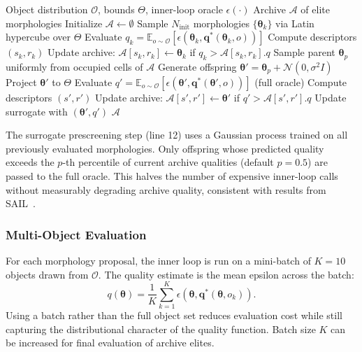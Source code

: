 \documentclass[journal]{IEEEtran}
\newcommand{\btheta}{\boldsymbol{\theta}}
\newcommand{\bq}{\mathbf{q}}
\newcommand{\cO}{\mathcal{O}}
\newcommand{\cA}{\mathcal{A}}
\newcommand{\eps}{\epsilon}
\begin{document}
\begin{algorithm}
\caption{MAP-Elites for Morphology Optimization}
\label{alg:mapelites}
\begin{algorithmic}[1]
\REQUIRE Object distribution $\cO$, bounds $\Theta$, inner-loop oracle $\eps(\cdot)$
\ENSURE Archive $\cA$ of elite morphologies
\STATE Initialize $\cA \leftarrow \emptyset$
\STATE Sample $N_{\text{init}}$ morphologies $\{\btheta_k\}$ via Latin hypercube over $\Theta$
\FOR{each $\btheta_k$}
  \STATE Evaluate $q_k = \mathbb{E}_{o \sim \cO}[\eps(\btheta_k, \bq^*(\btheta_k, o))]$
  \STATE Compute descriptors $(s_k, r_k)$
  \STATE Update archive: $\cA[s_k, r_k] \leftarrow \btheta_k$ if $q_k > \cA[s_k, r_k].q$
\ENDFOR
{}
  \STATE Sample parent $\btheta_p$ uniformly from occupied cells of $\cA$
  \STATE Generate offspring $\btheta' = \btheta_p + \mathcal{N}(0, \sigma^2 I)$
  \STATE Project $\btheta'$ to $\Theta$
  \IF{surrogate $\hat{q}(\btheta') > q_{\text{thresh}}$}
    \STATE Evaluate $q' = \mathbb{E}_{o \sim \cO}[\eps(\btheta', \bq^*(\btheta', o))]$ (full oracle)
    \STATE Compute descriptors $(s', r')$
    \STATE Update archive: $\cA[s', r'] \leftarrow \btheta'$ if $q' > \cA[s', r'].q$
    \STATE Update surrogate with $(\btheta', q')$
  \ENDIF
\ENDFOR
\RETURN $\cA$
\end{algorithmic}
\end{algorithm}

The surrogate prescreening step (line 12) uses a Gaussian process trained on
all previously evaluated morphologies.
Only offspring whose predicted quality exceeds the $p$-th percentile of current archive
qualities (default $p = 0.5$) are passed to the full oracle.
This halves the number of expensive inner-loop calls without measurably degrading archive
quality, consistent with results from SAIL~\cite{gaier2017sail}.

\subsubsection{Multi-Object Evaluation}

For each morphology proposal, the inner loop is run on a mini-batch of $K = 10$ objects
drawn from $\cO$.
The quality estimate is the mean epsilon across the batch:
\begin{equation}
  q(\btheta) = \frac{1}{K} \sum_{k=1}^K \eps(\btheta, \bq^*(\btheta, o_k)).
  \label{eq:quality}
\end{equation}
Using a batch rather than the full object set reduces evaluation cost while still
capturing the distributional character of the quality function.
Batch size $K$ can be increased for final evaluation of archive elites.
\end{document}
